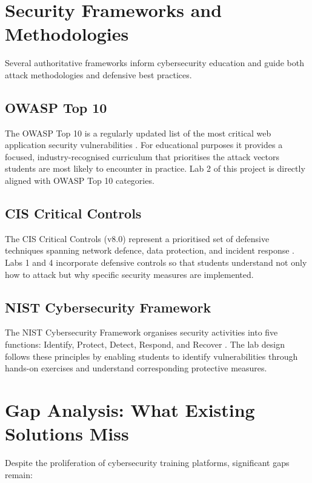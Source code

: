 \section{Security Frameworks and Methodologies}

Several authoritative frameworks inform cybersecurity education and guide both attack
methodologies and defensive best practices.

\subsection{OWASP Top 10}

The OWASP Top 10 is a regularly updated list of the most critical web application security
vulnerabilities \cite{owasp2021}. For educational purposes it provides a focused, industry-recognised
curriculum that prioritises the attack vectors students are most likely to encounter in practice.
Lab 2 of this project is directly aligned with OWASP Top 10 categories.

\subsection{CIS Critical Controls}

The CIS Critical Controls (v8.0) represent a prioritised set of defensive techniques spanning
network defence, data protection, and incident response \cite{cis_controls}. Labs 1 and 4
incorporate defensive controls so that students understand not only how to attack but why
specific security measures are implemented.

\subsection{NIST Cybersecurity Framework}

The NIST Cybersecurity Framework organises security activities into five functions: Identify,
Protect, Detect, Respond, and Recover \cite{nist_framework}. The lab design follows these
principles by enabling students to identify vulnerabilities through hands-on exercises and
understand corresponding protective measures.


\section{Gap Analysis: What Existing Solutions Miss}

Despite the proliferation of cybersecurity training platforms, significant gaps remain:

